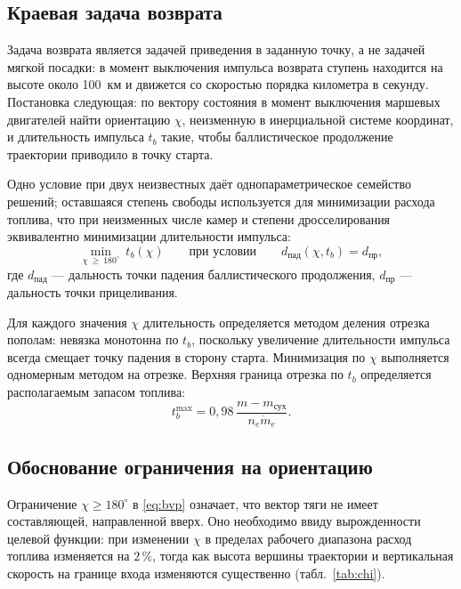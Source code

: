 \documentclass[11pt,a4paper]{article}
\begin{document}
\subsection{Краевая задача возврата}

Задача возврата является задачей приведения в заданную точку, а не задачей
мягкой посадки: в момент выключения импульса возврата ступень находится на
высоте около 100~км и движется со скоростью порядка километра в секунду.
Постановка следующая: по вектору состояния в момент выключения маршевых
двигателей найти ориентацию $\chi$, неизменную в инерциальной системе координат,
и длительность импульса $t_b$ такие, чтобы баллистическое продолжение траектории
приводило в точку старта.

Одно условие при двух неизвестных даёт однопараметрическое семейство решений;
оставшаяся степень свободы используется для минимизации расхода топлива, что при
неизменных числе камер и степени дросселирования эквивалентно минимизации
длительности импульса:
\begin{equation}
\min_{\chi\ \ge\ 180^\circ}\ t_b(\chi)
\qquad\text{при условии}\qquad
d_{\text{пад}}\left(\chi, t_b\right) = d_{\text{пр}} ,
\label{eq:bvp}
\end{equation}
где $d_{\text{пад}}$ — дальность точки падения баллистического продолжения,
$d_{\text{пр}}$ — дальность точки прицеливания.

Для каждого значения $\chi$ длительность определяется методом деления отрезка
пополам: невязка монотонна по $t_b$, поскольку увеличение длительности импульса
всегда смещает точку падения в сторону старта. Минимизация по $\chi$ выполняется
одномерным методом на отрезке. Верхняя граница отрезка по $t_b$ определяется
располагаемым запасом топлива:
\begin{equation}
t_b^{\max}=0{,}98\,\frac{m-m_{\text{сух}}}{n_e\dot m_e}.
\end{equation}

\subsection{Обоснование ограничения на ориентацию}

Ограничение $\chi\ge180^\circ$ в \eqref{eq:bvp} означает, что вектор тяги не
имеет составляющей, направленной вверх. Оно необходимо ввиду вырожденности
целевой функции: при изменении $\chi$ в пределах рабочего диапазона расход
топлива изменяется на $2\,\%$, тогда как высота вершины траектории и вертикальная
скорость на границе входа изменяются существенно (табл.~\ref{tab:chi}).
\end{document}
